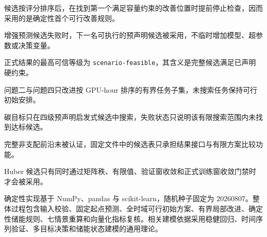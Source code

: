 候选按评分排序后，在找到第一个满足容量约束的改善位置时提前停止检查，因而采用的是确定性首个可行改善规则。

增强预测候选失败时，下一名可执行的预声明候选被采用，不临时增加模型、超参数或决策变量。

正式结果的最高可信等级为 \texttt{scenario-feasible}，其含义是完整候选满足已声明硬约束。

问题二与问题四只改进按 GPU-hour 排序的有界任务子集，未搜索任务保持可行初始安排。

碳目标只在四级预声明启发式候选中搜索，失败状态只说明该有限搜索范围内未找到达标候选。

完整非支配前沿未被认证，固定文件中的候选表只承担结果接口与有限方案比较功能。

Huber 候选只有同时通过矩阵秩、有限值、验证窗收敛和正式训练窗收敛门禁时才会被采用。

确定性实现基于 NumPy、pandas 与 scikit-learn，随机种子固定为 $20260807$。整体过程包含输入校验、固定起点预测、全时域可行初始方案、有界局部改进、确定性储能规则、七情景重算和向量化指标复核。相关建模依据采用稳健回归、时间序列验证、多目标决策和储能状态建模的通用理论\cite{huber1964robust,hyndman2018forecasting,miettinen1999multiobjective,lindenberger2017energy}。

